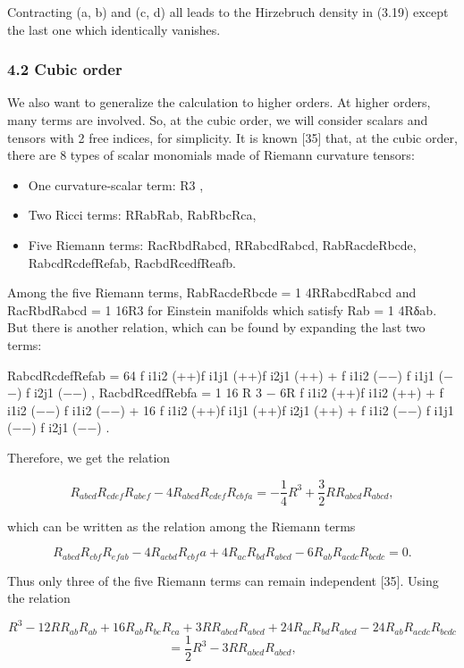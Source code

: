 \documentclass{article}
\begin{document}
Contracting (a, b) and (c, d) all leads to the Hirzebruch density in (3.19) except the last one which identically vanishes.

\subsubsection{4.2 Cubic order}

We also want to generalize the calculation to higher orders. At higher orders, many terms are involved. So, at the cubic order, we will consider scalars and tensors with 2 free indices, for simplicity. It is known [35] that, at the cubic order, there are 8 types of scalar monomials made of Riemann curvature tensors:
\begin{itemize}
\item 
One curvature-scalar term: R3 ,

\item 
Two Ricci terms: RRabRab, RabRbcRca,

\item 
Five Riemann terms: RacRbdRabcd, RRabcdRabcd, RabRacdeRbcde, RabcdRcdefRefab, RacbdRcedfReafb.

\end{itemize}

Among the five Riemann terms, RabRacdeRbcde = 1 4RRabcdRabcd and RacRbdRabcd = 1 16R3 for Einstein manifolds which satisfy Rab = 1 4Rδab. But there is another relation, which can be found by expanding the last two terms:

RabcdRcdefRefab = 64 f i1i2 (++)f i1j1 (++)f i2j1 (++) + f i1i2 (−−) f i1j1 (−−) f i2j1 (−−) , RacbdRcedfRebfa = 1 16 R 3 − 6R f i1i2 (++)f i1i2 (++) + f i1i2 (−−) f i1i2 (−−) + 16 f i1i2 (++)f i1j1 (++)f i2j1 (++) + f i1i2 (−−) f i1j1 (−−) f i2j1 (−−) .

Therefore, we get the relation

$$R_{abcd}R_{cdef}R_{abef}-4R_{abcd}R_{cdef}R_{cbfa}=-\frac{1}{4}R^{3}+\frac{3}{2}RR_{abcd}R_{abcd},\tag{4.18}$$

which can be written as the relation among the Riemann terms

$$R_{abcd}R_{cbf}R_{efab}-4R_{acbd}R_{cbf}a+4R_{ac}R_{bd}R_{abcd}-6R_{ab}R_{acdc}R_{bcdc}=0.\tag{4.19}$$

Thus only three of the five Riemann terms can remain independent [35]. Using the relation

$$R^{3}-12RR_{ab}R_{ab}+16R_{ab}R_{bc}R_{ca}+3RR_{abcd}R_{abcd}+24R_{ac}R_{bd}R_{abcd}-24R_{ab}R_{acdc}R_{bcdc}$$ $$=\frac{1}{2}R^{3}-3RR_{abcd}R_{abcd},\tag{4.20}$$
\end{document}
